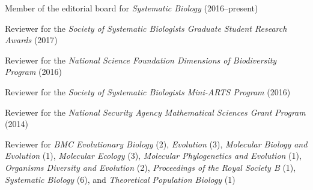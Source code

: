 \myHangIndent
Member of the editorial board for \emph{Systematic Biology} (2016--present)

\myHangIndent
Reviewer for the
    \emph{Society of Systematic Biologists Graduate Student Research Awards} (2017)

\myHangIndent
Reviewer for the
    \emph{National Science Foundation Dimensions of Biodiversity Program} (2016)

\myHangIndent
Reviewer for the
    \emph{Society of Systematic Biologists Mini-ARTS Program} (2016)

\myHangIndent
Reviewer for the
    \emph{National Security Agency Mathematical Sciences Grant Program} (2014)


\myHangIndent
Reviewer for
    \emph{BMC Evolutionary Biology} (2),
    \emph{Evolution} (3),
    \emph{Molecular Biology and Evolution} (1),
    \emph{Molecular Ecology} (3),
    \emph{Molecular Phylogenetics and Evolution} (1),
    \emph{Organisms Diversity and Evolution} (2),
    \emph{Proceedings of the Royal Society B} (1),
    \emph{Systematic Biology} (6),
    and
    \emph{Theoretical Population Biology} (1)


